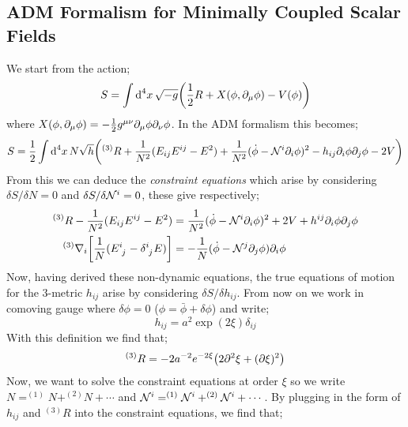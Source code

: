 \subsection{ADM Formalism for Minimally Coupled Scalar Fields}
We start from the action;
\begin{equation*}
S = \int{\upd{^4 x}\sqrt{-g}\left(\frac{1}{2}R + X(\phi, \del_\mu \phi) - V(\phi)\right)}
\end{equation*}
where $X(\phi, \partial_\mu \phi) = -\tfrac{1}{2}g^{\mu\nu}\partial_\mu \phi \partial_\nu \phi$. In the ADM formalism this becomes;
\begin{dmath*}
S = \frac{1}{2}\int{\upd{^4x}N\sqrt{h}}\left(^{(3)}R + \frac{1}{N^2}(E_{ij}E^{ij} - E^{2}) + \frac{1}{N^2}(\dot{\phi} - \mN^{i} \del_i \phi)^2 - h_{ij}\del_i \phi \del_j \phi - 2V\right)
\end{dmath*}
From this we can deduce the \emph{constraint equations} which arise by considering $\delta S / \delta N = 0$ and $\delta S / \delta \mathcal{N}^{i} = 0$, these give respectively;
\begin{align}
^{(3)}R - \frac{1}{N^2}(E_{ij}E^{ij} - E^{2}) &= \frac{1}{N^2}(\dot{\phi} - \mN^{i}\del_i \phi)^2 + 2V + h^{ij}\del_i \phi \del_j \phi \\
^{(3)}\nabla_i \left[\frac{1}{N}(E\indices{^{i}_{j}} - \delta\indices{^{i}_{j}}E)\right] &= -\frac{1}{N}(\dot{\phi} - \mN^{j}\del_j \phi)\del_i \phi
\end{align}
Now, having derived these non-dynamic equations, the true equations of motion for the $3$-metric $h_{ij}$ arise by considering $\delta S / \delta h_{ij}$. From now on we work in comoving gauge\footnotemark{} where $\delta \phi = 0$ ($\phi = \bar{\phi} + \delta \phi$) and write;
\begin{equation*}
h_{ij} = a^2 \exp\left(2 \xi\right)\delta_{ij}
\end{equation*}
With this definition we find that;
\begin{equation*}
^{(3)}R = - 2a^{-2}e^{-2\xi}\left(2\del^2 \xi + (\del \xi)^2\right)
\end{equation*}
Now, we want to solve the constraint equations at order $\xi$ so we write $N = ^{(1)}N + ^{(2)}N + \cdots$ and $\mathcal{N}^{i} = ^{(1)}\mathcal{N}^{i} + ^{(2)}\mathcal{N}^{i} + \cdots$. By plugging in the form of $h_{ij}$ and $^{(3)}R$ into the constraint equations, we find that;
